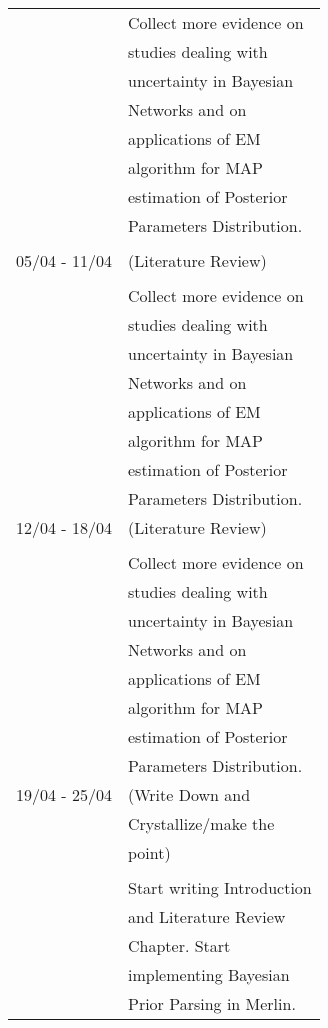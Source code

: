 \documentclass[a4paper]{article}
\begin{document}
\begin{center}
\begin{tabular}{|l|l|}
 & Collect more evidence on \\
 & studies dealing with \\
 & uncertainty in Bayesian \\
 & Networks and on \\
 & applications of EM \\
 & algorithm for MAP \\
 & estimation of Posterior \\
 & Parameters Distribution. \\
 & \\
\hline
05/04 - 11/04 & (Literature Review) \\
 & \\
 & Collect more evidence on \\
 & studies dealing with \\
 & uncertainty in Bayesian \\
 & Networks and on \\
 & applications of EM \\
 & algorithm for MAP \\
 & estimation of Posterior \\
 & Parameters Distribution. \\
\hline
12/04 - 18/04 & (Literature Review) \\
 & \\
 & Collect more evidence on \\
 & studies dealing with \\
 & uncertainty in Bayesian \\
 & Networks and on \\
 & applications of EM \\
 & algorithm for MAP \\
 & estimation of Posterior \\
 & Parameters Distribution. \\
\hline
19/04 - 25/04 & (Write Down and \\
 & Crystallize/make the \\
 & point) \\
 & \\
 & Start writing Introduction \\
 & and Literature Review \\
 & Chapter. Start \\
 & implementing Bayesian \\
 & Prior Parsing in Merlin. \\
\hline
\end{tabular}
\end{center}
\end{document}
